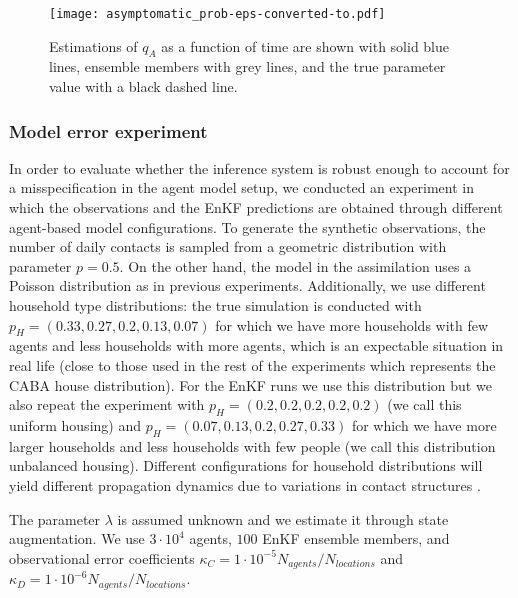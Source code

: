 \documentclass[11pt,a4paper]{article}
\begin{document}
\begin{figure}
    \captionsetup{width=0.5\textwidth}
    \centering
    \texttt{[image: asymptomatic\_prob-eps-converted-to.pdf]}
    \caption{Estimations of $q_A$ as a function of time are shown with solid blue lines, ensemble members with grey lines, and the true parameter value with a black dashed line.}
    \label{fig:asymptomatic_prob}
\end{figure}

\subsubsection{Model error experiment} \label{sec:model_error_exp}

In order to evaluate whether the inference system is robust enough to account for a misspecification in the agent model setup, we conducted an experiment in which the observations and the EnKF predictions are obtained through different agent-based model configurations. To generate the synthetic observations, the number of daily contacts is sampled from a geometric distribution with parameter $p=0.5$. On the other hand, the model in the assimilation uses a Poisson distribution as in previous experiments. Additionally, we use different household type distributions: the true simulation is conducted with $p_H = (0.33, 0.27, 0.2, 0.13, 0.07)$ for which we have more households with few agents and less households with more agents, which is an expectable situation in real life (close to those used in the rest of the experiments which represents the CABA house distribution). For the EnKF runs we use this distribution but we also repeat the experiment with $p_H = (0.2, 0.2, 0.2, 0.2, 0.2)$ (we call this uniform housing) and $p_H = (0.07, 0.13, 0.2, 0.27, 0.33)$ for which we have more larger households and less households with few people (we call this distribution unbalanced housing). Different configurations for household distributions will yield different propagation dynamics due to variations in contact structures \citep{Grossmann2021}.

The parameter $\lambda$ is assumed unknown and we estimate it through state augmentation. We use $3\cdot 10^4$ agents, $100$ EnKF ensemble members, and observational error coefficients $\kappa_{C} = 1 \cdot 10^{-5} N_{agents}/N_{locations}$ and $\kappa_{D} = 1 \cdot 10^{-6} N_{agents}/N_{locations}$. 
\end{document}
